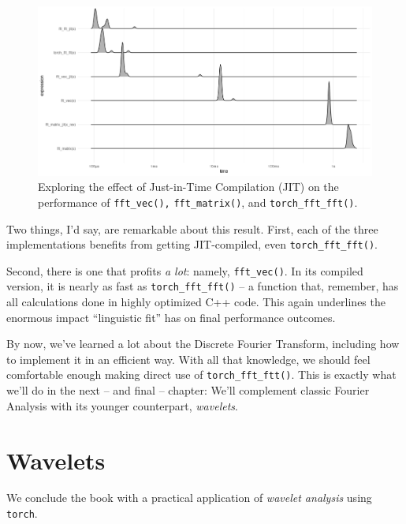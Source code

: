 \documentclass[
  letterpaper,
]{krantz}
\begin{document}
\begin{figure}[H]

{\centering \includegraphics{images/fft-perf-jit.png}

}

\caption{\label{fig-fft-perf-jit}Exploring the effect of Just-in-Time
Compilation (JIT) on the performance of \texttt{fft\_vec(),}
\texttt{fft\_matrix()}, and \texttt{torch\_fft\_fft()}.}

\end{figure}

Two things, I'd say, are remarkable about this result. First, each of
the three implementations benefits from getting JIT-compiled, even
\texttt{torch\_fft\_fft()}.

Second, there is one that profits \emph{a lot}: namely,
\texttt{fft\_vec()}. In its compiled version, it is nearly as fast as
\texttt{torch\_fft\_fft()} -- a function that, remember, has all
calculations done in highly optimized C++ code. This again underlines
the enormous impact ``linguistic fit'' has on final performance
outcomes.

By now, we've learned a lot about the Discrete Fourier Transform,
including how to implement it in an efficient way. With all that
knowledge, we should feel comfortable enough making direct use of
\texttt{torch\_fft\_ftt()}. This is exactly what we'll do in the next --
and final -- chapter: We'll complement classic Fourier Analysis with its
younger counterpart, \emph{wavelets}.

\hypertarget{sec:wavelets}{%
\chapter{Wavelets}\label{sec:wavelets}}

We conclude the book with a practical application of \emph{wavelet
analysis} using \texttt{torch}.
\end{document}
